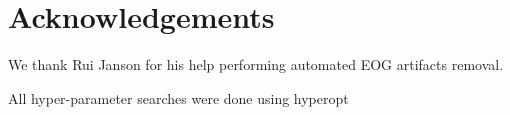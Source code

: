 \documentclass[utf8]{frontiersSCNS} %
\begin{document}
\section{Acknowledgements}

We thank Rui Janson for his help performing automated EOG artifacts removal.


All hyper-parameter searches were done using hyperopt \cite{Bergstra2013}


\end{document}
